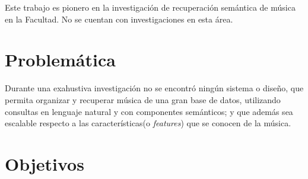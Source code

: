 Este trabajo es pionero en la investigación de recuperación semántica de música en la Facultad. No se cuentan con investigaciones en esta área. 

\section{Problemática}
\label{sec:problem}

Durante una exahustiva investigación no se encontró ningún sistema o diseño, que permita organizar y recuperar música de una gran base de datos, utilizando consultas en lenguaje natural y con componentes semánticos; y que además sea escalable respecto a las características(o \textit{features}) que se conocen de la música. \\
\section{Objetivos}
\label{sec:objective}

